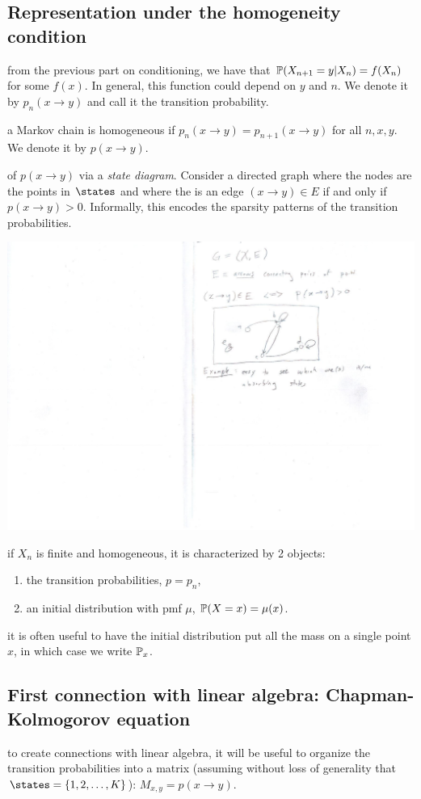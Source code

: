 \documentclass{article}
\begin{document}
\subsection{Representation under the homogeneity condition}\label{sec:state-diagram}

 from the previous part on conditioning, we have that $\P(X_{n+1} = y | X_n) = f(X_n)$ for some $f(x)$. In general, this function could depend on $y$ and $n$. We denote it by $p_n(x \to y)$ and call it the transition probability.

 a Markov chain is homogeneous if $p_n(x \to y) = p_{n+1}(x \to y)$ for all $n, x, y$. We denote it by $p(x \to y)$. 

 of $p(x \to y)$ via a \emph{state diagram}. Consider a directed graph where the nodes are the points in $\states$ and where the is an edge $(x \to y) \in E$ if and only if $p(x \to y) > 0$. Informally, this encodes the sparsity patterns of the transition probabilities.
\begin{center}
	\includegraphics[width=0.3\linewidth]{figures/state-diagram} 
\end{center}

 if $X_n$ is finite and homogeneous, it is characterized by 2 objects:
\begin{enumerate}
  \item the transition probabilities, $p = p_n$,
  \item an initial distribution with pmf $\mu$, $\P(X = x) = \mu(x)$. 
\end{enumerate} 

 it is often useful to have the initial distribution put all the mass on a single point $x$, in which case we write $\P_x$. 


\subsection{First connection with linear algebra: Chapman-Kolmogorov equation}

 to create connections with linear algebra, it will be useful to organize the transition probabilities into a matrix (assuming without loss of generality that $\states = \{1, 2, \dots, K\}$): $M_{x,y} = p(x \to y)$.
\end{document}
